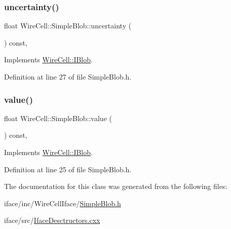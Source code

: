 \mbox{\label{class_wire_cell_1_1_simple_blob_a011fc52f38b039df8212e517760d3340}} 
\subsubsection{\texorpdfstring{uncertainty()}{uncertainty()}}
{\footnotesize\ttfamily float Wire\+Cell\+::\+Simple\+Blob\+::uncertainty (\begin{DoxyParamCaption}{ }\end{DoxyParamCaption}) const\hspace{0.3cm}{\ttfamily [inline]}, {\ttfamily [virtual]}}



Implements \hyperlink{class_wire_cell_1_1_i_blob_a02f100fb7404321e90471bd2430381e4}{Wire\+Cell\+::\+I\+Blob}.



Definition at line 27 of file Simple\+Blob.\+h.

\mbox{\label{class_wire_cell_1_1_simple_blob_ad4e01188fcc5814783beca0895c814b3}} 
\subsubsection{\texorpdfstring{value()}{value()}}
{\footnotesize\ttfamily float Wire\+Cell\+::\+Simple\+Blob\+::value (\begin{DoxyParamCaption}{ }\end{DoxyParamCaption}) const\hspace{0.3cm}{\ttfamily [inline]}, {\ttfamily [virtual]}}



Implements \hyperlink{class_wire_cell_1_1_i_blob_a3ce475d8fcd507ee6ffa0237db4d6c80}{Wire\+Cell\+::\+I\+Blob}.



Definition at line 25 of file Simple\+Blob.\+h.



The documentation for this class was generated from the following files\+:\begin{DoxyCompactItemize}
\item 
iface/inc/\+Wire\+Cell\+Iface/\hyperlink{_simple_blob_8h}{Simple\+Blob.\+h}\item 
iface/src/\hyperlink{_iface_desctructors_8cxx}{Iface\+Desctructors.\+cxx}\end{DoxyCompactItemize}
